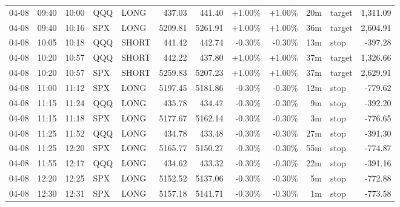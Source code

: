 \documentclass[11pt,a4paper]{article}
\begin{document}
\begin{center}
\begin{longtable}{>{\color{txtmain}}l l l l l r r r r r >{\color{txtmain}}l r}
04-08 & 09:40 & 10:00 & QQQ & LONG & 437.03 & 441.40 & \textcolor{wingreen}{+1.00\%} & \textcolor{wingreen}{+1.00\%} & 20m & target & \textcolor{wingreen}{1,311.09} \\
04-08 & 09:40 & 10:16 & SPX & LONG & 5209.81 & 5261.91 & \textcolor{wingreen}{+1.00\%} & \textcolor{wingreen}{+1.00\%} & 36m & target & \textcolor{wingreen}{2,604.91} \\
04-08 & 10:05 & 10:18 & QQQ & SHORT & 441.42 & 442.74 & \textcolor{lossred}{-0.30\%} & \textcolor{lossred}{-0.30\%} & 13m & stop & \textcolor{lossred}{-397.28} \\
04-08 & 10:20 & 10:57 & QQQ & SHORT & 442.22 & 437.80 & \textcolor{wingreen}{+1.00\%} & \textcolor{wingreen}{+1.00\%} & 37m & target & \textcolor{wingreen}{1,326.66} \\
04-08 & 10:20 & 10:57 & SPX & SHORT & 5259.83 & 5207.23 & \textcolor{wingreen}{+1.00\%} & \textcolor{wingreen}{+1.00\%} & 37m & target & \textcolor{wingreen}{2,629.91} \\
04-08 & 11:00 & 11:12 & SPX & LONG & 5197.45 & 5181.86 & \textcolor{lossred}{-0.30\%} & \textcolor{lossred}{-0.30\%} & 12m & stop & \textcolor{lossred}{-779.62} \\
04-08 & 11:15 & 11:24 & QQQ & LONG & 435.78 & 434.47 & \textcolor{lossred}{-0.30\%} & \textcolor{lossred}{-0.30\%} & 9m & stop & \textcolor{lossred}{-392.20} \\
04-08 & 11:15 & 11:18 & SPX & LONG & 5177.67 & 5162.14 & \textcolor{lossred}{-0.30\%} & \textcolor{lossred}{-0.30\%} & 3m & stop & \textcolor{lossred}{-776.65} \\
04-08 & 11:25 & 11:52 & QQQ & LONG & 434.78 & 433.48 & \textcolor{lossred}{-0.30\%} & \textcolor{lossred}{-0.30\%} & 27m & stop & \textcolor{lossred}{-391.30} \\
04-08 & 11:25 & 12:20 & SPX & LONG & 5165.77 & 5150.27 & \textcolor{lossred}{-0.30\%} & \textcolor{lossred}{-0.30\%} & 55m & stop & \textcolor{lossred}{-774.87} \\
04-08 & 11:55 & 12:17 & QQQ & LONG & 434.62 & 433.32 & \textcolor{lossred}{-0.30\%} & \textcolor{lossred}{-0.30\%} & 22m & stop & \textcolor{lossred}{-391.16} \\
04-08 & 12:20 & 12:25 & SPX & LONG & 5152.52 & 5137.06 & \textcolor{lossred}{-0.30\%} & \textcolor{lossred}{-0.30\%} & 5m & stop & \textcolor{lossred}{-772.88} \\
04-08 & 12:30 & 12:31 & SPX & LONG & 5157.18 & 5141.71 & \textcolor{lossred}{-0.30\%} & \textcolor{lossred}{-0.30\%} & 1m & stop & \textcolor{lossred}{-773.58} \\

\end{longtable}
\end{center}
\end{document}
